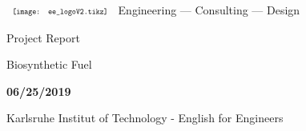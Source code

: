 \pagestyle{empty}
  \begin{titlepage}
$
\begin{array}{l}
\resizebox{3cm}{!}{\texttt{[image: ee\_logoV2.tikz]}}
\end{array}
$ {\Large {}Engineering --- Consulting --- Design}

  	\vspace*{3cm} 
  	
  	\begin{center} \large 
  		Project Report
  		\vspace*{2cm}
  		
  		{\huge Biosynthetic Fuel}
  		\vspace*{\fill}
  		
  		\textbf{06/25/2019}

  		\vspace*{1.5cm}
  		
  		Karlsruhe Institut of Technology - English for Engineers
  	\end{center}
  \end{titlepage}